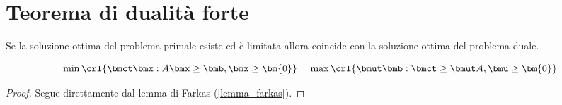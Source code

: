 \documentclass[\main/main.tex]{subfiles}
\begin{document}
\section{Teorema di dualità forte}

\begin{theorem}
  \label{dualita_forte}
  Se la soluzione ottima del problema primale esiste ed è limitata allora coincide con la soluzione ottima del problema duale.

  \[
    \min\crl{\bmct\bmx: A\bmx \geq \bmb, \bmx \geq \bm{0}} = \max\crl{\bmut\bmb: \bmct \geq \bmut A, \bmu \geq \bm{0}}
  \]
\end{theorem}

\begin{proof}
  Segue direttamente dal lemma di Farkas (\ref{lemma_farkas}).
\end{proof}
\end{document}
